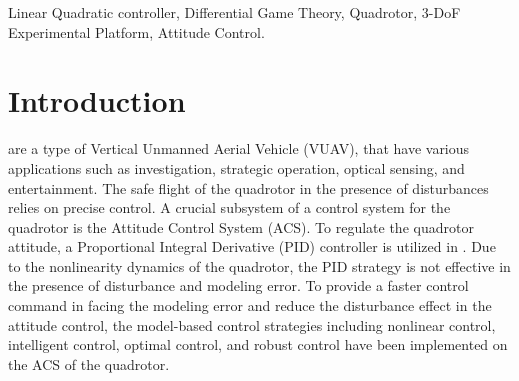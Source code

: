 \documentclass[peerreview]{IEEEtran}
\begin{document}
\begin{IEEEkeywords}
  Linear Quadratic controller, Differential Game Theory, Quadrotor, 3-DoF Experimental Platform, Attitude Control. 
\end{IEEEkeywords}








%



\section{Introduction}\label{sec:intro}
% 
% 
% 
% 
are a type of Vertical Unmanned Aerial Vehicle (VUAV), that have various applications such as investigation, strategic operation, optical sensing, and entertainment.
The safe flight of the quadrotor in the presence of disturbances relies on precise control. 
A crucial subsystem of a control system for the quadrotor is the Attitude Control System (ACS). 
To regulate the quadrotor attitude, a Proportional Integral Derivative (PID) controller is utilized in \cite{article_Abdul, article_Bolandi}. Due to the nonlinearity dynamics of the quadrotor, the PID strategy is not effective in the presence of disturbance and modeling error.
To provide a faster control command in facing the modeling error and reduce the disturbance effect in the attitude control, the model-based control strategies including nonlinear control, intelligent control, optimal control, and robust control have been implemented on the ACS of the quadrotor.
\end{document}
